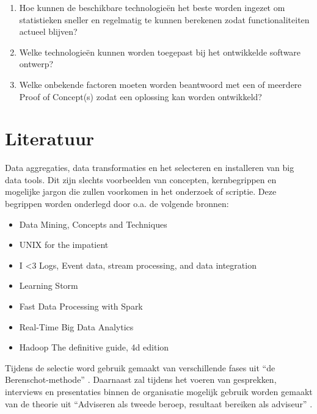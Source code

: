 \begin{enumerate}
\begin{enumerate}
    \item Hoe kunnen de beschikbare technologieën het beste worden ingezet om statistieken sneller en regelmatig te kunnen berekenen zodat functionaliteiten actueel blijven?

    \item Welke technologieën kunnen worden toegepast bij het ontwikkelde software ontwerp?

    \item Welke onbekende factoren moeten worden beantwoord met een of meerdere Proof of Concept(s) zodat een oplossing kan worden ontwikkeld?
    \end{enumerate}
\end{enumerate}


\section{Literatuur} %

Data aggregaties, data transformaties en het selecteren en installeren van big data tools. Dit zijn slechts voorbeelden van concepten, kernbegrippen en mogelijke jargon die zullen voorkomen in het onderzoek of scriptie. Deze begrippen worden onderlegd door o.a. de volgende bronnen:

\begin{itemize}
    \item Data Mining, Concepts and Techniques \parencite{data-mining}
    \item UNIX for the impatient \parencite{unix}
    \item I <3 Logs, Event data, stream processing, and data integration \parencite{logs}
    \item Learning Storm \parencite{learning-storm}
    \item Fast Data Processing with Spark \parencite{spark}
    \item Real-Time Big Data Analytics \parencite{realtime-architectures}
    \item Hadoop The definitive guide, 4d edition \parencite{hadoop-definitive}
\end{itemize}

Tijdens de selectie word gebruik gemaakt van verschillende fases uit “de Berenschot-methode” \parencite{cuppen}.
Daarnaast zal tijdens het voeren van gesprekken, interviews en presentaties binnen de organisatie mogelijk gebruik worden gemaakt van de theorie uit “Adviseren als tweede beroep, resultaat bereiken als adviseur” \parencite{adviseren}.

